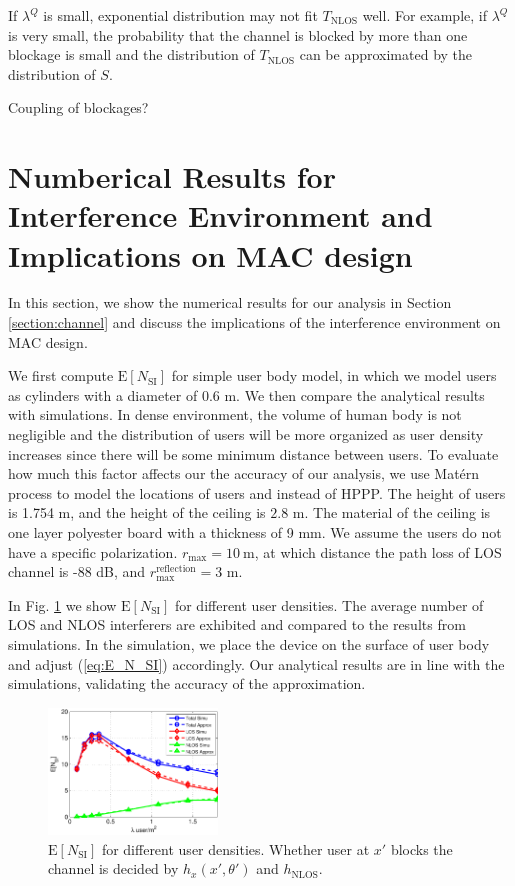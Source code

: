 \documentclass[10pt, conference, letterpaper]{IEEEtran}
\newcommand*{\Rom}[1]{\uppercase\expandafter{\romannumeral #1\relax}} %
\DeclareMathOperator*{\NLOS}{\mathrm{NLOS}}
\begin{document}
If $\lambda^Q$ is small, exponential distribution may not fit $T_{\NLOS}$ well. For example, if $\lambda^Q$ is very small, the probability that the channel is blocked by more than one blockage is small and the distribution of $T_{\NLOS}$ can be approximated by the distribution of $S$.

Coupling of blockages?


\section{Numberical Results for Interference Environment and Implications on MAC design} \label{section:channel_numerical}
In this section, we show the numerical results for our analysis in Section \ref{section:channel} and discuss the implications of the interference environment on MAC design. 

We first compute $\mathrm{E}[N_{\mathrm{SI}}]$ for simple user body model, in which we model users as cylinders with a diameter of 0.6 m. We then compare the analytical results with simulations. In dense environment, the volume of human body is not negligible and the distribution of users will be more organized as user density increases since there will be some minimum distance between users. To evaluate how much this factor affects our the accuracy of our analysis, we use Mat\'ern \Rom{3} process \cite{matern} to model the locations of users and instead of HPPP. The height of users is 1.754 m, and the height of the ceiling is $2.8$ m. The material of the ceiling is one layer polyester board with a thickness of 9 mm. We assume the users do not have a specific polarization. $r_{\max} = 10\mathrm{~m}$, at which distance the path loss of LOS channel is -88 dB, and $r_{\max}^{\mathrm{reflection}} = 3$ m. 

In Fig. \ref{fig:Channel_en_si} we show $\mathrm{E}[N_{\mathrm{SI}}]$ for different user densities. The average number of LOS and NLOS interferers are exhibited and compared to the results from simulations. In the simulation, we place the device on the surface of user body and adjust (\ref{eq:E_N_SI}) accordingly. Our analytical results are in line with the simulations, validating the accuracy of the approximation. 

\begin{figure}
	\centering
	\includegraphics[width = 0.4\textwidth]{Channel_en_si.pdf}
	\caption{$\mathrm{E}[N_{\mathrm{SI}}]$ for different user densities. Whether user at $x'$ blocks the channel is decided by $h_x(x',\theta')$ and $h_{\mathrm{NLOS}}$.}
	\label{fig:Channel_en_si}
\end{figure}
\end{document}
